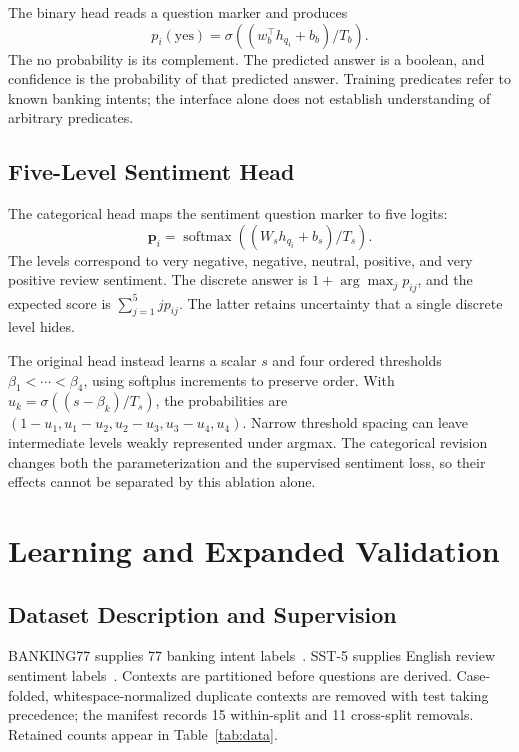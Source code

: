 \documentclass[conference]{IEEEtran}
\begin{document}
The binary head reads a question marker and produces
\begin{equation}
p_i(\mathrm{yes})=\sigma((w_b^\top h_{q_i}+b_b)/T_b).
\end{equation}
The no probability is its complement. The predicted answer is a boolean, and confidence is the probability of that predicted answer. Training predicates refer to known banking intents; the interface alone does not establish understanding of arbitrary predicates.

\subsection{Five-Level Sentiment Head}
The categorical head maps the sentiment question marker to five logits:
\begin{equation}
\boldsymbol{p}_i=\operatorname{softmax}((W_s h_{q_i}+b_s)/T_s).
\end{equation}
The levels correspond to very negative, negative, neutral, positive, and very positive review sentiment. The discrete answer is $1+\arg\max_j p_{ij}$, and the expected score is $\sum_{j=1}^{5}j p_{ij}$. The latter retains uncertainty that a single discrete level hides.

The original head instead learns a scalar $s$ and four ordered thresholds $\beta_1<\cdots<\beta_4$, using softplus increments to preserve order. With $u_k=\sigma((s-\beta_k)/T_s)$, the probabilities are $(1-u_1,u_1-u_2,u_2-u_3,u_3-u_4,u_4)$. Narrow threshold spacing can leave intermediate levels weakly represented under argmax. The categorical revision changes both the parameterization and the supervised sentiment loss, so their effects cannot be separated by this ablation alone.

\section{Learning and Expanded Validation}
\subsection{Dataset Description and Supervision}
BANKING77 supplies 77 banking intent labels~\cite{banking}. SST-5 supplies English review sentiment labels~\cite{sst}. Contexts are partitioned before questions are derived. Case-folded, whitespace-normalized duplicate contexts are removed with test taking precedence; the manifest records 15 within-split and 11 cross-split removals. Retained counts appear in Table~\ref{tab:data}.
\end{document}
